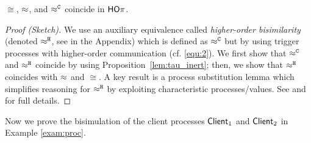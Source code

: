 
\begin{theorem}[Coincidence]\rm
	\label{the:coincidence}
$\cong$, $\approx$,  and $\approx^\mathtt{C}$ coincide in $\mathsf{HO}\pi$. 
\vspace{-1mm}
\end{theorem}
\begin{proof}[Proof (Sketch)]
We use an auxiliary equivalence called \emph{higher-order bisimilarity} (denoted $\approx^\mathtt{H}$, see  in the Appendix) which 
is defined as $\approx^\mathtt{C}$ but by
using  trigger processes with higher-order communication (cf. \eqref{equ:2}).
We first show that $\approx^\mathtt{C}$ and $\approx^\mathtt{H}$ coincide by using 
Proposition~\ref{lem:tau_inert}; 
then, we show that $\approx^\mathtt{H}$ coincides with $\approx$ and $\cong$. 
A key result is a process substitution lemma which simplifies reasoning 
for $\approx^\mathtt{H}$
by exploiting characteristic processes/values.
See
and~\cite{KouzapasPY15} for full details.
\end{proof}
Now we prove the bisimulation of the client processes 
$\mathsf{Client}_1$ and $\mathsf{Client}_2$ 
in Example \ref{exam:proc}.

